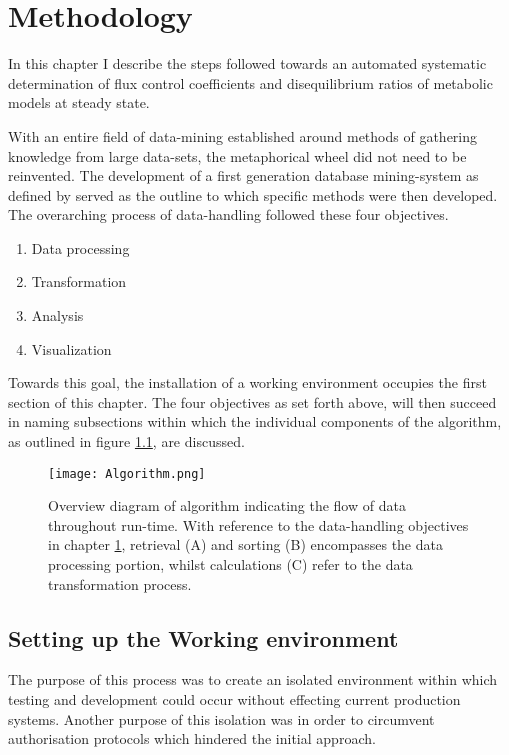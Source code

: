 \chapter{Methodology} \label{chp:3}
In this chapter I describe the steps followed towards an automated systematic determination of flux control coefficients and disequilibrium ratios of metabolic models at steady state. 

With an entire field of data-mining established around methods of gathering knowledge from large data-sets, the metaphorical wheel did not need to be reinvented. The development of a first generation database mining-system as defined by \citeauthor{Imielinski1996, Radivojac2004, Uppalaiah2012} served as the outline to which specific methods were then developed. The overarching process of data-handling followed these four objectives.

\begin{enumerate}
\item Data processing
\item Transformation
\item Analysis
\item Visualization
\end{enumerate} 

Towards this goal, the installation of a working environment occupies the first section of this chapter. The four objectives as set forth above, will then succeed in naming subsections within which the individual components of the algorithm, as outlined in figure \ref{Algorithm}, are discussed. 

\begin{figure}[h] 
\texttt{[image: Algorithm.png]}
\centering
\caption{Overview diagram of algorithm indicating the flow of data throughout run-time. With reference to the data-handling objectives in chapter \ref{chp:3}, retrieval (A) and sorting (B) encompasses the data processing portion, whilst calculations (C) refer to the data transformation process.}
\label{Algorithm}
\end{figure}

\section{Setting up the Working environment} \label{Working Environment}
The purpose of this process was to create an isolated environment within which testing and development could occur without effecting current production systems. Another purpose of this isolation was in order to circumvent authorisation protocols which hindered the initial approach. 

